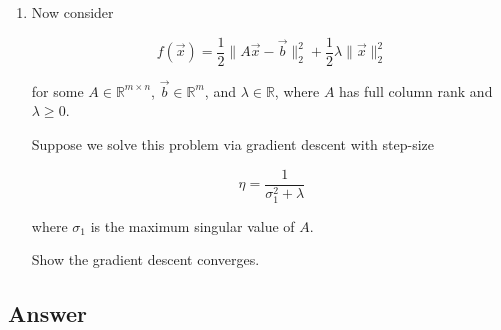 \documentclass[
  12pt,
]{fphw}
\begin{document}
\begin{enumerate}
\item[(d)] Now consider

\[
f(\vec{x}) =
\frac{1}{2}\|A\vec{x} - \vec{b}\|_2^2
+
\frac{1}{2}\lambda \|\vec{x}\|_2^2
\]

for some $A \in \mathbb{R}^{m\times n}$, $\vec{b} \in \mathbb{R}^m$, and $\lambda \in \mathbb{R}$, where $A$ has full column rank and $\lambda \ge 0$.

Suppose we solve this problem via gradient descent with step-size

\[
\eta = \frac{1}{\sigma_1^2 + \lambda}
\]

where $\sigma_1$ is the maximum singular value of $A$.

Show the gradient descent converges.

\end{enumerate}

\subsection*{Answer}
\end{document}
